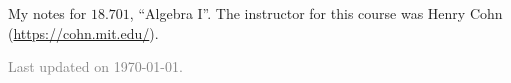 \documentclass[11pt]{article}
\begin{document}
\maketitle

My notes for $18.701$, ``Algebra I''. The instructor for this course was Henry Cohn (\url{https://cohn.mit.edu/}). 

\vfill

\hfill \textcolor{gray}{\small Last updated on \today.}
\newpage
\tableofcontents 
\newpage
\importfiles %
\end{document}
